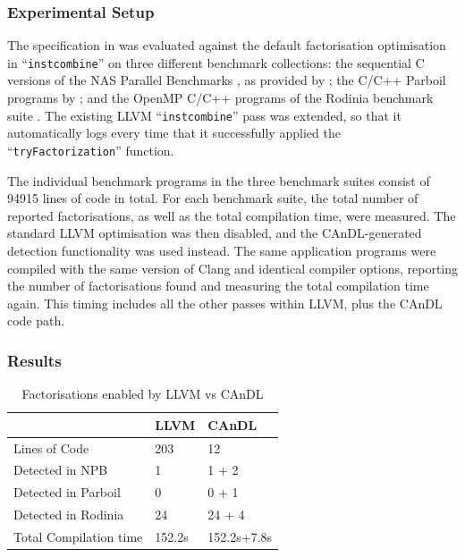 \subsubsection{Experimental Setup}

    The specification in  was evaluated against the default
    factorisation optimisation in ``\texttt{instcombine}'' on three different
    benchmark collections:
    the sequential C versions of the NAS Parallel Benchmarks
    \citep{Bailey1991NPB}, as provided by \citet{seo2011performance};
    the C/C++ Parboil programs by \citet{stratton2012parboil};
    and the OpenMP C/C++ programs of the Rodinia benchmark suite
    \citep{Che2009Rodinia}.
    The existing LLVM ``\texttt{instcombine}'' pass was extended, so that it
    automatically logs every time that it successfully applied the
    ``\texttt{tryFactorization}'' function.  

    The individual benchmark programs in the three benchmark
    suites consist of 94915 lines of code in total.
    For each benchmark suite, the total number of reported factorisations, as
    well as the total compilation time, were measured.
    The standard LLVM optimisation was then disabled, and the CAnDL-generated
    detection functionality was used instead.
    The same application programs were compiled with the same version of Clang
    and identical compiler options, reporting the number of factorisations
    found and measuring the total compilation time again.
    This timing includes all the other passes within LLVM, plus the CAnDL code
    path.

\subsubsection{Results}

\begin{table}[t]
  \centering
  \begin{tabular}{lll}
    \toprule
    & {\bf LLVM} & {\bf CAnDL} \\
    \midrule
    Lines of Code & 203 & 12 \\
    Detected in NPB & 1 & 1 + 2 \\
    Detected in Parboil & 0 & 0 + 1\\
    Detected in Rodinia & 24 & 24 + 4\\
    Total Compilation time & 152.2s & 152.2s+7.8s \\
    \bottomrule
\end{tabular}
\caption{Factorisations enabled by LLVM vs CAnDL}
\label{fig:factorization_results}
\end{table}

